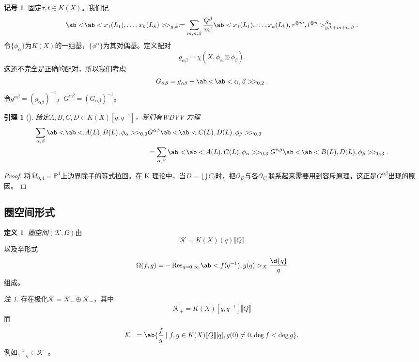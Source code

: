 \documentclass{amsart}
\newtheorem{lem}[thm]{引理}
\theoremstyle{definition}
\newtheorem{defn}[thm]{定义}
\newtheorem{notn}[thm]{记号}
\theoremstyle{remark}
\newtheorem{rmk}[thm]{注}
\theoremstyle{plain}
\theoremstyle{definition}
\theoremstyle{remark}
\renewcommand{\P}{\mathbb{P}}
\newcommand{\mc}[1]{\mathcal{#1}}
\newcommand{\on}[1]{\operatorname{#1}}
\newcommand{\1}{\mathbf{1}}
\newcommand{\2}{\mathbf{2}}
\newcommand{\3}{\mathbf{3}}
\newcommand{\ps}[1]{\llbracket #1 \rrbracket}
\begin{document}
\begin{notn}
    固定\(\tau, t \in K(X)\)。我们记
    \[ \ab<\!\ab<x_1(L_1), \ldots, x_k(L_k)>\!>_{g,k} \coloneqq \sum_{m,n,\beta} \frac{Q^{\beta}}{m!} \ab<x_1(L_1), \ldots, x_k(L_k), \tau^{\otimes m}, t^{\otimes n}>_{g,k+m+n,\beta}^{S_n}. \]
    令\(\{\phi_{\alpha}\}\)为\(K(X)\)的一组基，\(\{\phi^{\alpha}\}\)为其对偶基。定义配对
    \[ g_{\alpha\beta} = \chi(X, \phi_{\alpha} \otimes \phi_{\beta}). \]
    这还不完全是正确的配对，所以我们考虑
    \[ G_{\alpha\beta} = g_{\alpha\beta} + \ab<\!\ab<\alpha,\beta>\!>_{0,2}. \]
    令\(g^{\alpha\beta} = (g_{\alpha\beta})^{-1}\)，\(G^{\alpha\beta} = (G_{\alpha\beta})^{-1}\)。
\end{notn}

\begin{lem}[{\cite{Givental2000K}}]
    给定\(A,B,C,D \in K(X)[q,q^{-1}]\)，我们有\textit{WDVV 方程}
    \begin{align*}
        \sum_{\alpha,\beta} \ab<\!\ab< A(L), B(L), \phi_{\alpha}>\! >_{0,3}& G^{\alpha\beta}\ab<\!\ab< C(L), D(L), \phi_{\beta}>\! >_{0,3} \\
        &= \sum_{\alpha,\beta} \ab<\!\ab< A(L), C(L), \phi_{\alpha}>\! >_{0,3} G^{\alpha\beta}\ab<\!\ab< B(L), D(L), \phi_{\beta}>\! >_{0,3}. 
    \end{align*}
\end{lem}

\begin{proof}
    将\(\bar{M}_{0,4} = \P^1\)上边界除子的等式拉回。在 K 理论中，当\(D = \bigcup C_i\)时，把\(\mc{O}_D\)与各\(\mc{O}_{C_i}\)联系起来需要用到容斥原理，这正是\(G^{\alpha\beta}\)出现的原因。
\end{proof}

\subsection{圈空间形式}%
\label{sub:Loop space formalism}

\begin{defn}
    \textit{圈空间}\((\mc{K}, \Omega)\)由
    \[ \mc{K} = K(X)(q) \ps{Q}\]
    以及辛形式
    \[ \Omega(f, g) = - \on{Res}_{q = 0, \infty} \ab<f(q^{-1}), g(q)>_X \frac{\d{q}}{q} \]
    组成。
\end{defn}

\begin{rmk}
    存在极化\(\mc{K} = \mc{K}_+ \oplus \mc{K}_-\)，其中
    \[ \mc{K}_+ = K(X)[q, q^{-1}]\ps{Q} \]
    而
    \[ \mc{K}_- = \ab\{ \frac{f}{g} \mid f, g \in K(X)\ps{Q}[q], g(0) \neq 0, \deg f < \deg g\}. \]
    例如\(\frac{1}{1-q} \in \mc{K}_-\)。
\end{rmk}
\end{document}
